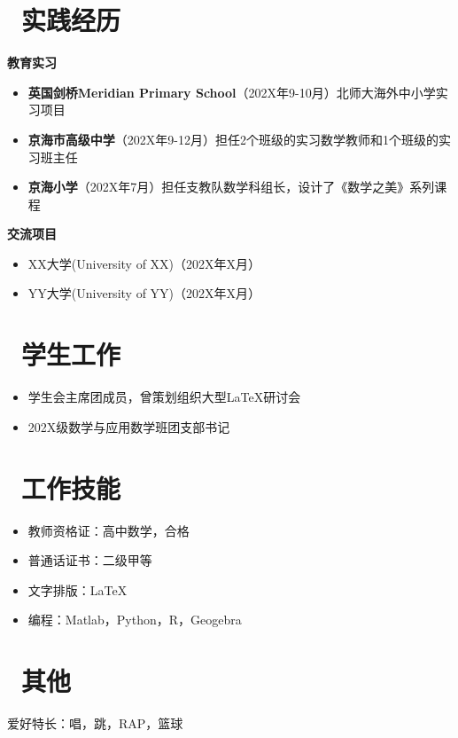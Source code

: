 \documentclass[11pt]{article}
\begin{document}
\section{\makebox[\widthof{\faGraduationCap}][c]{\color{CVBlue}\faUniversity}\ 实践经历}
\textbf{教育实习}
\begin{itemize}
	\item \textbf{英国剑桥Meridian Primary School}（202X年9-10月）北师大海外中小学实习项目
	\item \textbf{京海市高级中学}（202X年9-12月）担任2个班级的实习数学教师和1个班级的实习班主任
	\item \textbf{京海小学}（202X年7月）担任支教队数学科组长，设计了《数学之美》系列课程
\end{itemize}

\textbf{交流项目}
\begin{itemize}
	\item XX大学(University of XX)（202X年X月）
	\item YY大学(University of YY)（202X年X月）
\end{itemize}

%
%

\section{\makebox[\widthof{\faGraduationCap}][c]{\color{CVBlue}\faUsers}\ 学生工作}
\begin{itemize}
	\item 学生会主席团成员，曾策划组织大型\LaTeX{}研讨会
	\item 202X级数学与应用数学班团支部书记
\end{itemize}

\section{\makebox[\widthof{\faGraduationCap}][c]{\color{CVBlue}\faWrench}\ 工作技能}

\begin{itemize}
	\item 教师资格证：高中数学，合格
	\item 普通话证书：二级甲等
	\item 文字排版：\LaTeX{}
	\item 编程：Matlab，Python，R，Geogebra

\end{itemize}

\section{\makebox[\widthof{\faGraduationCap}][c]{\color{CVBlue}\faTags}\ 其他}
爱好特长：唱，跳，RAP，篮球

\end{document}
